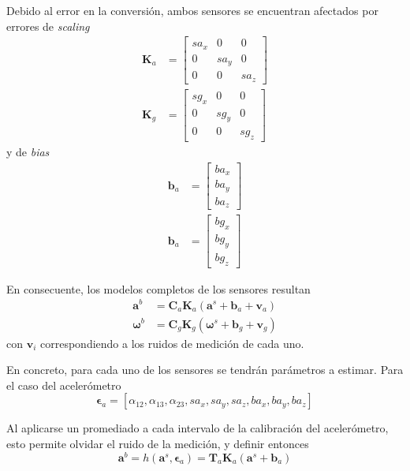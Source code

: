 Debido al error en la conversión, ambos sensores se encuentran afectados por errores de \textit{scaling}
\begin{align}
    \bm{K}_a &=
    \begin{bmatrix}
        sa_x & 0 & 0 \\
        0 & sa_y & 0 \\
        0 & 0 & sa_z
    \end{bmatrix}
    \\
    \bm{K}_g &=
    \begin{bmatrix}
        sg_x & 0 & 0 \\
        0 & sg_y & 0 \\
        0 & 0 & sg_z
    \end{bmatrix}
\end{align}
 y de \textit{bias}
 \begin{align}
    \bm{b}_a &=
    \begin{bmatrix}
        ba_x \\
        ba_y \\
        ba_z
    \end{bmatrix}
    \\
     \bm{b}_a &=
     \begin{bmatrix}
        bg_x \\
        bg_y \\
        bg_z
     \end{bmatrix}
\end{align}

En consecuente, los modelos completos de los sensores resultan
\begin{align}
    \bm{a}^b &= \bm{C}_a\bm{K}_a\left(\bm{a}^s + \bm{b}_a + \bm{v}_a\right) \\
    \bm{\omega}^b &= \bm{C}_g\bm{K}_g\left(\bm{\omega}^s + \bm{b}_g + \bm{v}_g\right)
\end{align}
con $\bm{v}_i$ correspondiendo a los ruidos de medición de cada uno.

En concreto, para cada uno de los sensores se tendrán parámetros a estimar. Para el caso del acelerómetro
\begin{equation}
    \bm{\epsilon}_{a} = [\alpha_{12},\alpha_{13},\alpha_{23},sa_x,sa_y,sa_z,ba_x,ba_y,ba_z]
    \label{eq:accelcalibrationparams}
\end{equation}

Al aplicarse un promediado a cada intervalo de la calibración del acelerómetro, esto permite olvidar el ruido de la medición, y definir entonces
\begin{equation}
    \bm{a}^b = h(\bm{a}^s,\bm{\epsilon}_{a}) = \bm{T}_a\bm{K}_a(\bm{a}^s+\bm{b}_a)    
\end{equation}

